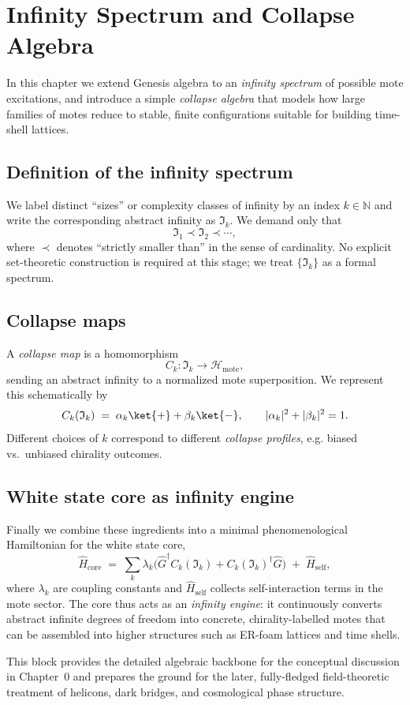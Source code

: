 \chapter{Infinity Spectrum and Collapse Algebra}

In this chapter we extend Genesis algebra to an \emph{infinity spectrum}
of possible mote excitations, and introduce a simple \emph{collapse
algebra} that models how large families of motes reduce to stable,
finite configurations suitable for building time-shell lattices.

\section{Definition of the infinity spectrum}

We label distinct ``sizes'' or complexity classes of infinity by an
index $k \in \mathbb{N}$ and write the corresponding abstract infinity
as $\mathfrak{I}_k$.  We demand only that
\begin{equation}
  \mathfrak{I}_1 \prec \mathfrak{I}_2 \prec \cdots,
  \label{eq:infinity-spectrum}
\end{equation}
where $\prec$ denotes ``strictly smaller than'' in the sense of
cardinality.  No explicit set-theoretic construction is required at this
stage; we treat $\{\mathfrak{I}_k\}$ as a formal spectrum.

\section{Collapse maps}

A \emph{collapse map} is a homomorphism
\[
  C_k : \mathfrak{I}_k \longrightarrow \mathcal{H}_{\mathrm{mote}},
\]
sending an abstract infinity to a normalized mote superposition.  We
represent this schematically by
\begin{equation}
  C_k(\mathfrak{I}_k)
    \;=\;
    \alpha_k \ket{+} + \beta_k \ket{-},
  \qquad
  |\alpha_k|^2 + |\beta_k|^2 = 1.
  \label{eq:collapse-map}
\end{equation}
Different choices of $k$ correspond to different \emph{collapse
profiles}, e.g. biased vs.\ unbiased chirality outcomes.

\section{White state core as infinity engine}

Finally we combine these ingredients into a minimal phenomenological
Hamiltonian for the white state core,
\begin{equation}
  \hat{H}_{\mathrm{core}}
   \;=\;
   \sum_{k} \lambda_k
      \bigl(
        \hat{G}^\dagger C_k(\mathfrak{I}_k)
        + C_k(\mathfrak{I}_k)^\dagger \hat{G}
      \bigr)
   \;+\; \hat{H}_{\mathrm{self}},
  \label{eq:white-core-hamiltonian}
\end{equation}
where $\lambda_k$ are coupling constants and $\hat{H}_{\mathrm{self}}$
collects self-interaction terms in the mote sector.  The core thus acts
as an \emph{infinity engine}: it continuously converts abstract
infinite degrees of freedom into concrete, chirality-labelled motes
that can be assembled into higher structures such as ER-foam lattices
and time shells.

This block provides the detailed algebraic backbone for the conceptual
discussion in Chapter~0 and prepares the ground for the later,
fully-fledged field-theoretic treatment of helicons, dark bridges, and
cosmological phase structure.
